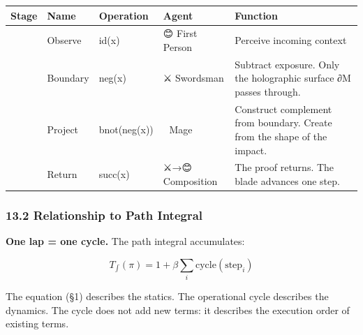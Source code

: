 \documentclass[
  11pt,
]{article}
\newcounter{none} %
\begin{document}
{\def\LTcaptype{none} %
\begin{longtable}[]{@{}
  >{\raggedright\arraybackslash}p{}
  >{\raggedright\arraybackslash}p{}
  >{\raggedright\arraybackslash}p{}
  >{\raggedright\arraybackslash}p{}
  >{\raggedright\arraybackslash}p{}@{}}
\toprule\noalign{}
\begin{minipage}[b]{\linewidth}\raggedright
Stage
\end{minipage} & \begin{minipage}[b]{\linewidth}\raggedright
Name
\end{minipage} & \begin{minipage}[b]{\linewidth}\raggedright
Operation
\end{minipage} & \begin{minipage}[b]{\linewidth}\raggedright
Agent
\end{minipage} & \begin{minipage}[b]{\linewidth}\raggedright
Function
\end{minipage} \\
\midrule\noalign{}
\endhead
\bottomrule\noalign{}
\endlastfoot
1 & Observe & id(x) & 😊 First Person & Perceive incoming context \\
2 & Boundary & neg(x) & ⚔️ Swordsman & Subtract exposure. Only the
holographic surface ∂M passes through. \\
3 & Project & bnot(neg(x)) & 🧙 Mage & Construct complement from
boundary. Create from the shape of the impact. \\
4 & Return & succ(x) & ⚔️→😊 Composition & The proof returns. The blade
advances one step. \\
\end{longtable}
}

\subsubsection{13.2 Relationship to Path
Integral}\label{relationship-to-path-integral}

\textbf{One lap = one cycle.} The path integral accumulates:

\[T_{\int}(\pi) = 1 + \beta \sum_i \text{cycle}(\text{step}_i)\]

The equation (§1) describes the statics. The operational cycle describes
the dynamics. The cycle does not add new terms: it describes the
execution order of existing terms.
\end{document}
